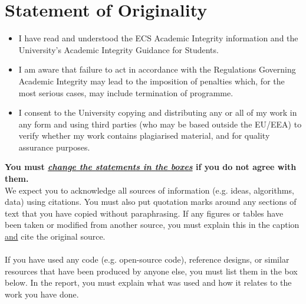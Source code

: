 \chapter*{Statement of Originality}


  \begin{itemize}
      \item I have read and understood the ECS Academic Integrity information and the University’s  Academic Integrity Guidance for Students.
      \item  I am aware that failure to act in accordance with the Regulations Governing Academic Integrity may lead to the imposition of penalties which, for the most serious cases, may include termination of programme.
      \item I consent to the University copying and distributing any or all of my work in any form and using third parties (who may be based outside the EU/EEA) to verify whether my work contains plagiarised material, and for quality assurance purposes.
  \end{itemize} 
  
\textbf{You must \underline{\textit{change the statements in the boxes}} if you do not agree with them.} \\
\textrm{We expect you to acknowledge all sources of information (e.g. ideas, algorithms, data) using 
citations. You must also put quotation marks around any sections of text that you have copied 
without paraphrasing. If any figures or tables have been taken or modified from another 
source, you must explain this in the caption \underline{and} cite the original source.} \\

 \\ 

\textrm{If you have used any code (e.g. open-source code), reference designs, or similar resources that 
have been produced by anyone else, you must list them in the box below. In the report, you 
must explain what was used and how it relates to the work you have done.} \\
 \\ 

